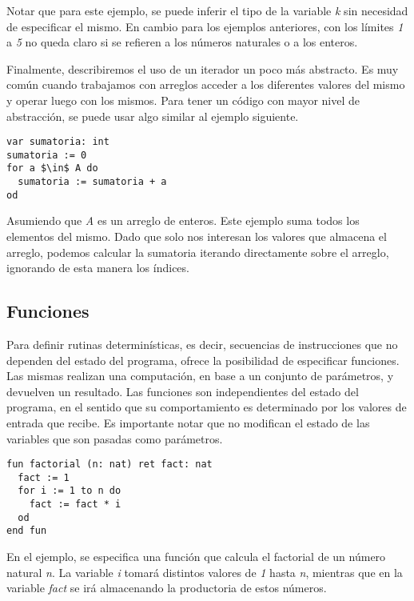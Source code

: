 \documentclass{article}
\begin{document}
Notar que para este ejemplo, se puede inferir el tipo de la variable \textit{k} sin necesidad de especificar el mismo.
En cambio para los ejemplos anteriores, con los límites \textit{1} a \textit{5} no queda claro si se refieren a los números naturales o a los enteros.

Finalmente, describiremos el uso de un iterador un poco más abstracto.
Es muy común cuando trabajamos con arreglos acceder a los diferentes valores del mismo y operar luego con los mismos.
Para tener un código con mayor nivel de abstracción, se puede usar algo similar al ejemplo siguiente.

\begin{lstlisting}
var sumatoria: int
sumatoria := 0
for a $\in$ A do
  sumatoria := sumatoria + a
od
\end{lstlisting}

Asumiendo que \textit{A} es un arreglo de enteros.
Este ejemplo suma todos los elementos del mismo.
Dado que solo nos interesan los valores que almacena el arreglo, podemos calcular la sumatoria iterando directamente sobre el arreglo, ignorando de esta manera los índices.

\subsection{Funciones}

Para definir rutinas determinísticas, es decir, secuencias de instrucciones que no dependen del estado del programa, \Lang\space ofrece la posibilidad de especificar funciones.
Las mismas realizan una computación, en base a un conjunto de parámetros, y devuelven un resultado.
Las funciones son independientes del estado del programa, en el sentido que su comportamiento es determinado por los valores de entrada que recibe.
Es importante notar que no modifican el estado de las variables que son pasadas como parámetros.

\begin{lstlisting}
fun factorial (n: nat) ret fact: nat
  fact := 1
  for i := 1 to n do
    fact := fact * i
  od
end fun
\end{lstlisting}

En el ejemplo, se especifica una función que calcula el factorial de un número natural \textit{n}.
La variable \textit{i} tomará distintos valores de \textit{1} hasta \textit{n}, mientras que en la variable \textit{fact} se irá almacenando la productoria de estos números.
\end{document}
